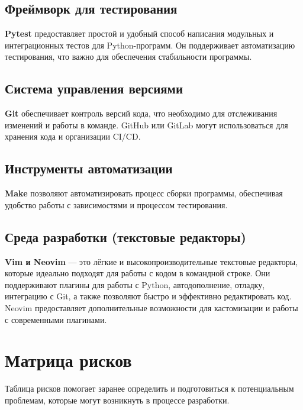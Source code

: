 \subsection{Фреймворк для тестирования}
\textbf{Pytest} предоставляет простой
и удобный способ написания модульных
и интеграционных тестов для Python-программ.
Он поддерживает автоматизацию тестирования,
что важно для обеспечения стабильности программы.

\subsection{Система управления версиями}
\textbf{Git} обеспечивает контроль версий кода,
что необходимо для отслеживания изменений и работы в команде.
GitHub или GitLab могут использоваться для хранения кода и организации CI/CD.

\subsection{Инструменты автоматизации}
\textbf{Make} позволяют автоматизировать процесс сборки программы,
обеспечивая удобство работы с зависимостями и процессом тестирования.

\subsection{Среда разработки (текстовые редакторы)}
\textbf{Vim и Neovim} --- это лёгкие
и высокопроизводительные текстовые редакторы,
которые идеально подходят для работы с кодом в командной строке.
Они поддерживают плагины для работы с Python, автодополнение, отладку,
интеграцию с Git, а также позволяют быстро
и эффективно редактировать код.
Neovim предоставляет дополнительные возможности
для кастомизации и работы с современными плагинами.

\section{Матрица рисков}

Таблица рисков помогает заранее определить
и подготовиться к потенциальным проблемам,
которые могут возникнуть в процессе разработки.

